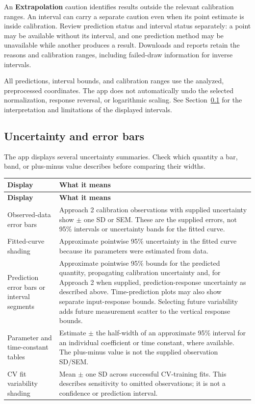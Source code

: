 An \textbf{Extrapolation} caution identifies results outside the relevant calibration ranges. An interval can carry a separate caution even when its point estimate is inside calibration. Review prediction status and interval status separately: a point may be available without its interval, and one prediction method may be unavailable while another produces a result. Downloads and reports retain the reasons and calibration ranges, including failed-draw information for inverse intervals.

All predictions, interval bounds, and calibration ranges use the analyzed, preprocessed coordinates. The app does not automatically undo the selected normalization, response reversal, or logarithmic scaling. See Section~\ref{sec:uncertainty} for the interpretation and limitations of the displayed intervals.


\subsection{Uncertainty and error bars}
\label{sec:uncertainty}

The app displays several uncertainty summaries. Check which quantity a bar, band, or plus-minus value describes before comparing their widths.

\begin{longtable}{@{}>{\raggedright\arraybackslash}p{}>{\raggedright\arraybackslash}p{}@{}}
\toprule
\textbf{Display} & \textbf{What it means} \\
\midrule
\endfirsthead
\toprule
\textbf{Display} & \textbf{What it means} \\
\midrule
\endhead
Observed-data error bars & Approach 2 calibration observations with supplied uncertainty show $\pm$ one SD or SEM. These are the supplied errors, not 95\% intervals or uncertainty bands for the fitted curve. \\
Fitted-curve shading & Approximate pointwise 95\% uncertainty in the fitted curve because its parameters were estimated from data. \\
Prediction error bars or interval segments & Approximate pointwise 95\% bounds for the predicted quantity, propagating calibration uncertainty and, for Approach 2 when supplied, prediction-response uncertainty as described above. Time-prediction plots may also show separate input-response bounds. Selecting future variability adds future measurement scatter to the vertical response bounds. \\
Parameter and time-constant tables & Estimate $\pm$ the half-width of an approximate 95\% interval for an individual coefficient or time constant, where available. The plus-minus value is not the supplied observation SD/SEM. \\
CV fit variability shading & Mean $\pm$ one SD across successful CV-training fits. This describes sensitivity to omitted observations; it is not a confidence or prediction interval. \\
\bottomrule
\end{longtable}

